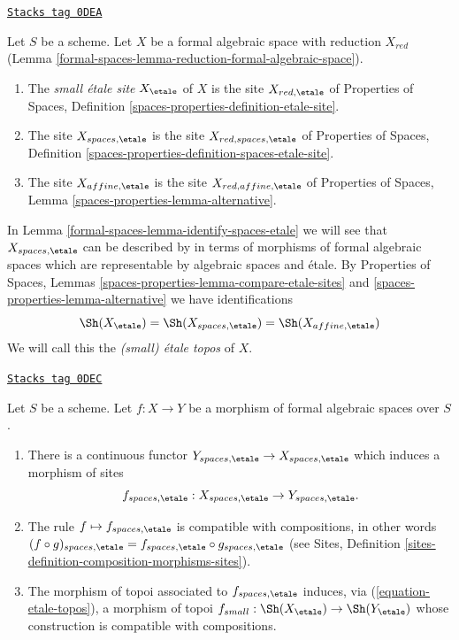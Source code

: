 \begin{definition}
\label{formal-spaces-definition-etale-sites}
\href{https://stacks.math.columbia.edu/tag/0DEA}{\texttt{Stacks tag 0DEA}}

Let $S$ be a scheme. Let $X$ be a formal algebraic space with
reduction $X_{red}$ (Lemma \ref{formal-spaces-lemma-reduction-formal-algebraic-space}).
\begin{enumerate}
\item The {\it small \'etale site} $X_\etale$ of $X$ is
the site $X_{red, \etale}$ of Properties of Spaces, Definition
\ref{spaces-properties-definition-etale-site}.
\item The site $X_{spaces, \etale}$ is the site
$X_{red, spaces, \etale}$ of Properties of Spaces, Definition
\ref{spaces-properties-definition-spaces-etale-site}.
\item The site $X_{affine, \etale}$ is the site
$X_{red, affine, \etale}$ of Properties of Spaces, Lemma
\ref{spaces-properties-lemma-alternative}.
\end{enumerate}
\end{definition}

In Lemma \ref{formal-spaces-lemma-identify-spaces-etale} we will see that
$X_{spaces, \etale}$ can be described by in terms of
morphisms of formal algebraic spaces which are representable
by algebraic spaces and \'etale.
By Properties of Spaces, Lemmas
\ref{spaces-properties-lemma-compare-etale-sites} and
\ref{spaces-properties-lemma-alternative}
we have identifications
\begin{equation}
\label{equation-etale-topos}
\Sh(X_\etale) = \Sh(X_{spaces, \etale}) = \Sh(X_{affine, \etale})
\end{equation}
We will call this the {\it (small) \'etale topos} of $X$.

\begin{lemma}
\label{formal-spaces-lemma-functoriality-etale-site}
\href{https://stacks.math.columbia.edu/tag/0DEC}{\texttt{Stacks tag 0DEC}}

Let $S$ be a scheme.
Let $f : X \to Y$ be a morphism of formal algebraic spaces over $S$.
\begin{enumerate}
\item There is a continuous functor
$Y_{spaces, \etale} \to X_{spaces, \etale}$
which induces a morphism of sites
$$
f_{spaces, \etale} : X_{spaces, \etale} \to Y_{spaces, \etale}.
$$
\item The rule $f \mapsto f_{spaces, \etale}$ is compatible with
compositions, in other words $(f \circ g)_{spaces, \etale}
= f_{spaces, \etale} \circ g_{spaces, \etale}$ (see
Sites, Definition \ref{sites-definition-composition-morphisms-sites}).
\item The morphism of topoi associated to $f_{spaces, \etale}$
induces, via (\ref{equation-etale-topos}), a morphism of topoi
$f_{small} : \Sh(X_\etale) \to \Sh(Y_\etale)$
whose construction is compatible with compositions.
\end{enumerate}
\end{lemma}

